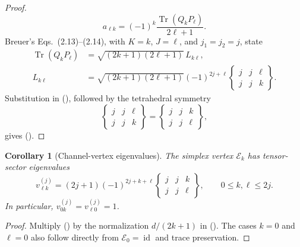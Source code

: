 \documentclass[twoside,10pt]{article}
\numberwithin{equation}{section}
\theoremstyle{slbody}
\newtheorem{corollary}[theorem]{Corollary}
\theoremstyle{definition}
\theoremstyle{remark}
\newcommand{\Tr}{\operatorname{Tr}}
\newcommand{\id}{\operatorname{id}}
\newcommand{\cE}{\mathcal E}
\renewcommand{\eqref}[1]{%
  \textup{{\normalfont(\oldstylenums{\ref{#1}}}\normalfont)}}
\begin{document}
\begin{proof}
\begin{equation}
 a_{\ell k}=(-1)^k\frac{\Tr(Q_kP_\ell)}{2\ell+1}.
\end{equation}
Breuer's Eqs.~(2.13)--(2.14), with \(K=k\), \(J=\ell\), and
\(j_1=j_2=j\), state
\begin{align}
 \Tr(Q_kP_\ell)
 &=\sqrt{(2k+1)(2\ell+1)}\,L_{k\ell},                       \label{eq:breuer-trace}\\
 L_{k\ell}
 &=\sqrt{(2k+1)(2\ell+1)}(-1)^{2j+\ell}
 \begin{Bmatrix}j&j&\ell\\j&j&k\end{Bmatrix}.              \label{eq:breuer-recoupling-specialized}
\end{align}
Substitution in \eqref{eq:a-from-QP}, followed by the tetrahedral
symmetry
\begin{equation*}
 \begin{Bmatrix}j&j&\ell\\j&j&k\end{Bmatrix}
 =\begin{Bmatrix}j&j&k\\j&j&\ell\end{Bmatrix},
\end{equation*}
gives \eqref{eq:a-lk}.
\end{proof}

\begin{corollary}[Channel-vertex eigenvalues]\label{cor:vertex-eigenvalues}
The simplex vertex \(\cE_k\) has tensor-sector eigenvalues
\begin{equation}\label{eq:vertex-eigenvalues}
 v^{(j)}_{\ell k}
 =(2j+1)(-1)^{2j+k+\ell}
 \begin{Bmatrix}j&j&k\\j&j&\ell\end{Bmatrix},
 \qquad 0\leq k,\ell\leq2j.
\end{equation}
In particular, \(v^{(j)}_{0k}=v^{(j)}_{\ell0}=1\).
\end{corollary}

\begin{proof}
Multiply \eqref{eq:a-lk} by the normalization \(d/(2k+1)\) in
\eqref{eq:vertex-channel}.  The cases \(k=0\) and \(\ell=0\) also
follow directly from \(\cE_0=\id\) and trace preservation.
\end{proof}
\end{document}
